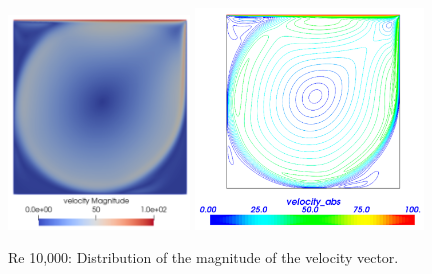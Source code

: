 \begin{figure}[H]
\centering
\includegraphics[width=0.43\textwidth]{DC_velocity_magnitude_10k}
\includegraphics[width=0.54\textwidth]{DC_velocity_mag_VTK_10k}
\caption{Re 10,000: Distribution of the magnitude of the velocity vector.}\label{fg:DC_velocity_magnitude_10k}
\end{figure} 

